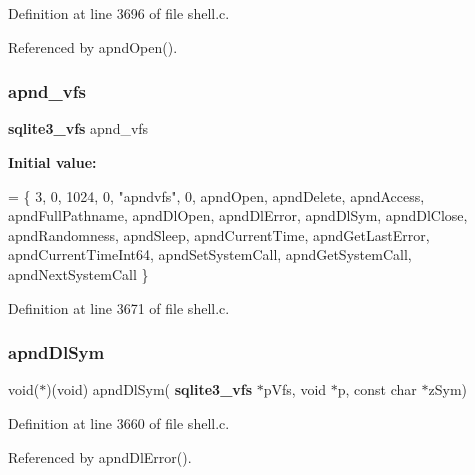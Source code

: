 Definition at line 3696 of file shell.\+c.



Referenced by apnd\+Open().

\mbox{\label{shell_8c_a3c887a4b51605d3bfeb31ccea72a2e3b}} 
\subsubsection{apnd\+\_\+vfs}
{\footnotesize\ttfamily \textbf{ sqlite3\+\_\+vfs} apnd\+\_\+vfs\hspace{0.3cm}{\ttfamily [static]}}

{\bfseries Initial value\+:}
\begin{DoxyCode}
= \{
  3,                            
  0,                            
  1024,                         
  0,                            
  \textcolor{stringliteral}{"apndvfs"},                    
  0,                             
  apndOpen,                     
  apndDelete,                   
  apndAccess,                   
  apndFullPathname,             
  apndDlOpen,                   
  apndDlError,                  
  apndDlSym,                    
  apndDlClose,                  
  apndRandomness,               
  apndSleep,                    
  apndCurrentTime,              
  apndGetLastError,             
  apndCurrentTimeInt64,         
  apndSetSystemCall,            
  apndGetSystemCall,            
  apndNextSystemCall            
\}
\end{DoxyCode}


Definition at line 3671 of file shell.\+c.

\mbox{\label{shell_8c_aab02ee173c489a9fbf026c13067df5ea}} 
\subsubsection{apnd\+Dl\+Sym}
{\footnotesize\ttfamily void($\ast$)(void) apnd\+Dl\+Sym(\textbf{ sqlite3\+\_\+vfs} $\ast$p\+Vfs, void $\ast$p, const char $\ast$z\+Sym)\hspace{0.3cm}{\ttfamily [static]}}



Definition at line 3660 of file shell.\+c.



Referenced by apnd\+Dl\+Error().

